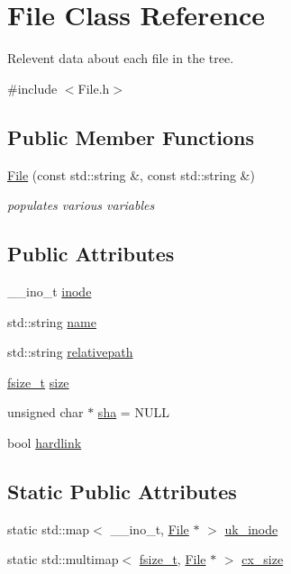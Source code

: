 \hypertarget{class_file}{}\section{File Class Reference}
\label{class_file}


Relevent data about each file in the tree.  




{\ttfamily \#include $<$File.\+h$>$}

\subsection*{Public Member Functions}
\begin{DoxyCompactItemize}
\item 
\hyperlink{class_file_a068da892ec6464ddf0dcbab2f55962f7}{File} (const std\+::string \&, const std\+::string \&)
\begin{DoxyCompactList}\small\item\em populates various variables \end{DoxyCompactList}\end{DoxyCompactItemize}
\subsection*{Public Attributes}
\begin{DoxyCompactItemize}
\item 
\+\_\+\+\_\+ino\+\_\+t \hyperlink{class_file_a9dadadf265382acd3ac5ca840829b6a6}{inode}
\item 
std\+::string \hyperlink{class_file_ac219294b38d3a3a422ad6ebacb041bb5}{name}
\item 
std\+::string \hyperlink{class_file_a2a3000e706022e1a6e37415ac3984884}{relativepath}
\item 
\hyperlink{_file_8h_a7c56ccac0642bb33c22bec7333682e67}{fsize\+\_\+t} \hyperlink{class_file_aa2ef804960a60130c63406db420e9cdc}{size}
\item 
unsigned char $\ast$ \hyperlink{class_file_ad44605a92eebe23c5738b0d64fdca7e1}{sha} = N\+U\+LL
\item 
bool \hyperlink{class_file_a77110ab18a54c978d72477ee49a0a4cd}{hardlink}
\end{DoxyCompactItemize}
\subsection*{Static Public Attributes}
\begin{DoxyCompactItemize}
\item 
static std\+::map$<$ \+\_\+\+\_\+ino\+\_\+t, \hyperlink{class_file}{File} $\ast$ $>$ \hyperlink{class_file_a32733129d25971738ccba2122b0b91a5}{uk\+\_\+inode}
\item 
static std\+::multimap$<$ \hyperlink{_file_8h_a7c56ccac0642bb33c22bec7333682e67}{fsize\+\_\+t}, \hyperlink{class_file}{File} $\ast$ $>$ \hyperlink{class_file_ab6d7686b65b377692d301aeb171f2788}{cx\+\_\+size}
\end{DoxyCompactItemize}


